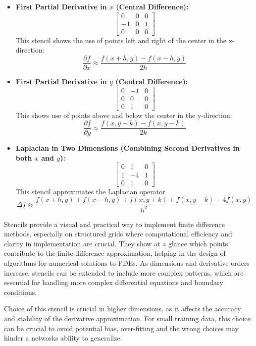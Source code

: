 \documentclass[11pt,a4paper]{article}
\theoremstyle{plain}
\theoremstyle{definition}
\theoremstyle{remark}
\begin{document}
\begin{itemize}
    \item \textbf{First Partial Derivative in \(x\) (Central Difference):}
    \[
    \begin{bmatrix}
    0 & 0 & 0 \\
    -1 & 0 & 1 \\
    0 & 0 & 0
    \end{bmatrix}
    \]
    This stencil shows the use of points left and right of the center in the x-direction:
    \[
    \frac{\partial f}{\partial x} \approx \frac{f(x+h, y) - f(x-h, y)}{2h}
    \]

    \item \textbf{First Partial Derivative in \(y\) (Central Difference):}
    \[
    \begin{bmatrix}
    0 & -1 & 0 \\
    0 & 0 & 0 \\
    0 & 1 & 0
    \end{bmatrix}
    \]
    This shows use of points above and below the center in the y-direction:
    \[
    \frac{\partial f}{\partial y} \approx \frac{f(x, y+k) - f(x, y-k)}{2k}
    \]

    \item \textbf{Laplacian in Two Dimensions (Combining Second Derivatives in both \(x\) and \(y\)):}
    \[
    \begin{bmatrix}
    0 & 1 & 0 \\
    1 & -4 & 1 \\
    0 & 1 & 0
    \end{bmatrix}
    \]
    This stencil approximates the Laplacian operator
    \[
    \Delta f \approx \frac{f(x+h,y) + f(x-h,y) + f(x,y+k) + f(x,y-k) - 4f(x,y)}{h^2}
    \]
\end{itemize}

Stencils provide a visual and practical way to implement finite difference methods, especially on structured grids where computational efficiency and clarity in implementation are crucial. They show at a glance which points contribute to the finite difference approximation, helping in the design of algorithms for numerical solutions to PDEs. As dimensions and derivative orders increase, stencils can be extended to include more complex patterns, which are essential for handling more complex differential equations and boundary conditions.

Choice of this stencil is crucial in higher dimensions, as it affects the accuracy and stability of the derivative approximation. For small training data, this choice can be crucial to avoid potential bias, over-fitting and the wrong choices may hinder a networks ability to generalize.
\end{document}
